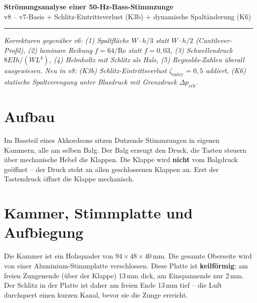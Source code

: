 \documentclass[11pt,a4paper]{article}
\begin{document}
\begin{center}
{\LARGE\bfseries\color{darkblue} Strömungsanalyse einer 50-Hz-Bass-Stimmzunge}\\[6pt]
{\large v8 -- v7-Basis + Schlitz-Eintrittsverlust (K3b) + dynamische Spaltänderung (K6)}\\[4pt]
\textcolor{accentred}{\rule{0.8\textwidth}{2pt}}
\end{center}
{\small\itshape Korrekturen gegenüber v6: (1) Spaltfläche $W \cdot h/3$ statt $W \cdot h/2$ (Cantilever-Profil), (2) laminare Reibung $f=64/\text{Re}$ statt $f=0{,}03$, (3) Schwellendruck $8EIh/(WL^4)$, (4) Helmholtz mit Schlitz als Hals, (5) Reynolds-Zahlen überall ausgewiesen. Neu in v8: (K3b) Schlitz-Eintrittsverlust $\zeta_\text{entry}=0{,}5$ addiert, (K6) statische Spaltverengung unter Blasdruck mit Grenzdruck $\Delta p_\text{crit}$.}

\vspace{4mm}

\section{Aufbau}

\begin{keybox}
Im Bassteil eines Akkordeons sitzen Dutzende Stimmzungen in eigenen Kammern, alle am selben Balg. Der Balg erzeugt den Druck, die Tasten steuern über mechanische Hebel die Klappen. Die Klappe wird \textbf{nicht} vom Balgdruck geöffnet -- der Druck steht an allen geschlossenen Klappen an. Erst der Tastendruck öffnet die Klappe mechanisch.
\end{keybox}

\section{Kammer, Stimmplatte und Aufbiegung}

Die Kammer ist ein Holzquader von $94 \times 48 \times 40$\,mm. Die gesamte Oberseite wird von einer Aluminium-Stimmplatte verschlossen. Diese Platte ist \textbf{keilförmig}: am freien Zungenende (über der Klappe) 13\,mm dick, am Einspannende nur 2\,mm. Der Schlitz in der Platte ist daher am freien Ende 13\,mm tief -- die Luft durchquert einen kurzen Kanal, bevor sie die Zunge erreicht.
\end{document}
